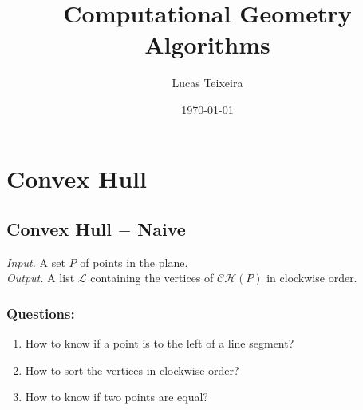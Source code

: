 \documentclass[12pt, a4paper]{article}
\title{Computational Geometry Algorithms}
\author{Lucas Teixeira}
\date{\today}
\begin{document}
\maketitle


\section{Convex Hull}

\subsection{Convex Hull $-$ Naive}

\begin{algorithm}
\caption{$ConvexHullNaive(P)$}
\textit{Input.} A set $P$ of points in the plane. \\
\textit{Output.} A list $\mathcal{L}$ containing the vertices of $\mathcal{CH}(P)$ in clockwise order.
\begin{algorithmic}[1]
            \EndIf{}
        \EndFor{}
        \EndIf{}
    \EndFor{}
\end{algorithmic}
\end{algorithm}

\subsubsection{Questions:}
\begin{enumerate}
  \item How to know if a point is to the left of a line segment?
  \item How to sort the vertices in clockwise order?
  \item How to know if two points are equal?
\end{enumerate}
\end{document}
